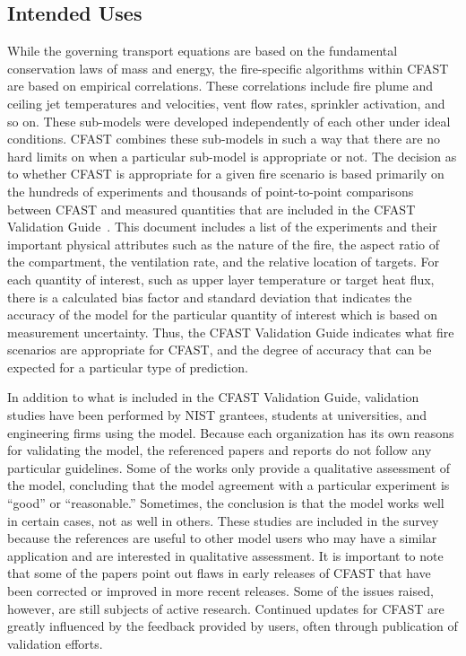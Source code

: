 \documentclass[11pt]{book}
\begin{document}
\subsection{Intended Uses}

While the governing transport equations are based on the fundamental conservation laws of mass and energy, the fire-specific algorithms within CFAST are based on empirical correlations. These correlations include fire plume and ceiling jet temperatures and velocities, vent flow rates, sprinkler activation, and so on. These sub-models were developed independently of each other under ideal conditions. CFAST combines these sub-models in such a way that there are no hard limits on when a particular sub-model is appropriate or not. The decision as to whether CFAST is appropriate for a given fire scenario is based primarily on the hundreds of experiments and thousands of point-to-point comparisons between CFAST and measured quantities that are included in the CFAST Validation Guide~\cite{CFAST_Valid_Guide_7}. This document includes a list of the experiments and their important physical attributes such as the nature of the fire, the aspect ratio of the compartment, the ventilation rate, and the relative location of targets. For each quantity of interest, such as upper layer temperature or target heat flux, there is a calculated bias factor and standard deviation that indicates the accuracy of the model for the particular quantity of interest which is based on measurement uncertainty. Thus, the CFAST Validation Guide indicates what fire scenarios are appropriate for CFAST, and the degree of accuracy that can be expected for a particular type of prediction.

In addition to what is included in the CFAST Validation Guide, validation studies have been performed by NIST grantees, students at universities, and engineering firms using the model.  Because each organization has its  own reasons for  validating the model, the  referenced papers and reports do not follow any particular guidelines. Some of the works only provide  a qualitative assessment  of the model,  concluding that the  model  agreement with  a  particular  experiment  is ``good''  or ``reasonable.'' Sometimes, the conclusion is that the model works well in certain cases, not as well in others. These studies are included in the survey because the references  are useful to other model users who may have a similar application  and are interested in qualitative assessment. It is important to note  that some of the papers point out flaws in early releases of CFAST that have been corrected or improved in more recent  releases. Some of  the issues raised, however,  are still subjects of  active research. Continued updates for CFAST  are greatly influenced by the feedback provided by users, often through publication of validation efforts.
\end{document}
